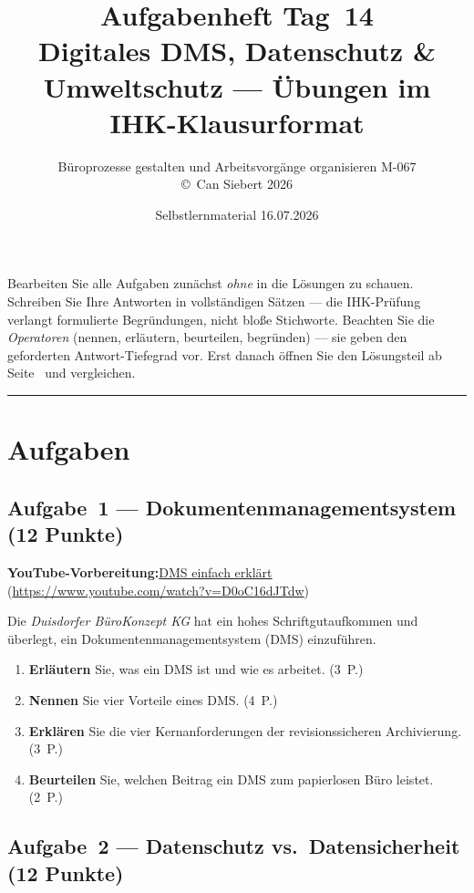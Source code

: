 \documentclass[11pt, a4paper]{article}
\title{\vspace*{-1.5cm}\Huge\bfseries\color{bfwPrimaryDark}Aufgabenheft Tag~14\\[0.4em]
  \large\color{bfwInkSoft}\textnormal{Digitales DMS, Datenschutz \& Umweltschutz --- Übungen im IHK-Klausurformat}}
\author{\textsf{Büroprozesse gestalten und Arbeitsvorgänge organisieren \textperiodcentered{} M-067}\\
\textsf{\small\copyright\ Can Siebert\,\textperiodcentered\,2026}}
\date{Selbstlernmaterial \textperiodcentered{} 16.07.2026}
\begin{document}
\maketitle
\thispagestyle{empty}

\begin{merksatz}[title={\bfseries So nutzen Sie dieses Aufgabenheft}]
Bearbeiten Sie alle Aufgaben zunächst \emph{ohne} in die Lösungen zu schauen. Schreiben
Sie Ihre Antworten in vollständigen Sätzen --- die IHK-Prüfung verlangt formulierte
Begründungen, nicht bloße Stichworte. Beachten Sie die \emph{Operatoren} (nennen,
erläutern, beurteilen, begründen) --- sie geben den geforderten Antwort-Tiefegrad vor.
Erst danach öffnen Sie den Lösungsteil ab Seite~\pageref{loesungen} und vergleichen.
\end{merksatz}

\tableofcontents
\vspace{1em}
\hrule

\section{Aufgaben}

\subsection*{Aufgabe~1 --- Dokumentenmanagementsystem (12 Punkte)}

\noindent\textbf{\color{bfwAccent}YouTube-Vorbereitung:}\enspace \href{https://www.youtube.com/watch?v=D0oC16dJTdw}{DMS einfach erklärt} (\url{https://www.youtube.com/watch?v=D0oC16dJTdw})

\medskip
Die \emph{Duisdorfer BüroKonzept KG} hat ein hohes Schriftgutaufkommen und überlegt, ein
Dokumentenmanagementsystem (DMS) einzuführen.

\begin{enumerate}[label=(\alph*)]
  \item \textbf{Erläutern} Sie, was ein DMS ist und wie es arbeitet. \hfill (3~P.)
  \item \textbf{Nennen} Sie vier Vorteile eines DMS. \hfill (4~P.)
  \item \textbf{Erklären} Sie die vier Kernanforderungen der revisionssicheren Archivierung. \hfill (3~P.)
  \item \textbf{Beurteilen} Sie, welchen Beitrag ein DMS zum papierlosen Büro leistet. \hfill (2~P.)
\end{enumerate}

\subsection*{Aufgabe~2 --- Datenschutz vs.\ Datensicherheit (12 Punkte)}
\end{document}
